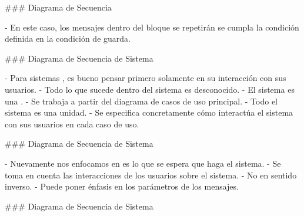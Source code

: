 ### Diagrama de Secuencia


- En este caso, los mensajes dentro del bloque se repetirán  se cumpla la condición definida en
la condición de guarda.

\newline

\vspace{-1em}

### Diagrama de Secuencia de Sistema


- Para sistemas , es bueno pensar primero solamente en su interacción con sus usuarios.
    - Todo lo que sucede dentro del sistema es desconocido.
    - El sistema es una .
- Se trabaja a partir del diagrama de casos de uso principal.
    - Todo el sistema es una unidad.
    - Se especifica concretamente cómo interactúa el sistema con sus usuarios en cada caso de uso.

### Diagrama de Secuencia de Sistema


- Nuevamente nos enfocamos en  es lo que se espera que haga el sistema.
- Se toma en cuenta las interacciones de los usuarios sobre el sistema.
    - No en sentido inverso.
- Puede poner énfasis en los parámetros de los mensajes.

### Diagrama de Secuencia de Sistema


